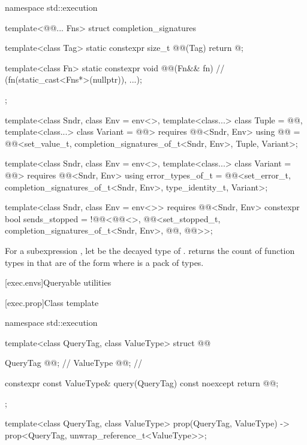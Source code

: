 \pnum
{}%
%
%
\begin{codeblock}
namespace std::execution {
  template<@@... Fns>
    struct completion_signatures {
      template<class Tag>
        static constexpr size_t @@(Tag) { return @\seebelow@; }

      template<class Fn>
        static constexpr void @@(Fn&& fn) {               // \expos
          (fn(static_cast<Fns*>(nullptr)), ...);
        }
    };

  template<class Sndr, class Env = env<>,
           template<class...> class Tuple = @@,
           template<class...> class Variant = @@>
      requires @@<Sndr, Env>
    using @@ =
      @@<set_value_t, completion_signatures_of_t<Sndr, Env>, Tuple, Variant>;

  template<class Sndr, class Env = env<>,
           template<class...> class Variant = @@>
      requires @@<Sndr, Env>
    using error_types_of_t =
      @@<set_error_t, completion_signatures_of_t<Sndr, Env>,
                        type_identity_t, Variant>;

  template<class Sndr, class Env = env<>>
      requires @@<Sndr, Env>
    constexpr bool sends_stopped =
      !@@<@@<>,
               @@<set_stopped_t, completion_signatures_of_t<Sndr, Env>,
                                 @@, @@>>;
}
\end{codeblock}

\pnum
For a subexpression ,
let  be the decayed type of .
returns the count of function types in  that
are of the form  where  is a pack of types.

[exec.envs]{Queryable utilities}

[exec.prop]{Class template }

\begin{codeblock}
namespace std::execution {
  template<class QueryTag, class ValueType>
  struct @@ {
    QueryTag @@;            // \expos
    ValueType @@;           // \expos

    constexpr const ValueType& query(QueryTag) const noexcept {
      return @@;
    }
  };

  template<class QueryTag, class ValueType>
    prop(QueryTag, ValueType) -> prop<QueryTag, unwrap_reference_t<ValueType>>;
}
\end{codeblock}

